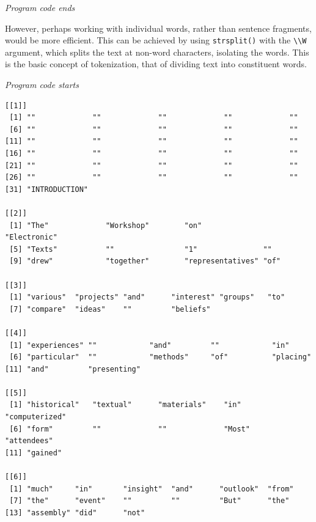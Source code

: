 \emph{Program code ends}

However, perhaps working with individual words, rather than sentence fragments,
would be more efficient. This can be achieved by using
\texttt{strsplit()} with the \texttt{\textbackslash{}\textbackslash{}W}
argument, which splits the text at non-word characters, isolating the
words. This is the basic concept of tokenization, that of dividing text into
constituent words.

\emph{Program code starts}

\begin{Shaded}
\begin{Highlighting}[]
\OtherTok{\textless{}{-}} \SpecialCharTok{\textbackslash{}\textbackslash{}}\NormalTok{)}
\end{Highlighting}
\end{Shaded}

\begin{verbatim}
[[1]]
 [1] ""             ""             ""             ""             ""            
 [6] ""             ""             ""             ""             ""            
[11] ""             ""             ""             ""             ""            
[16] ""             ""             ""             ""             ""            
[21] ""             ""             ""             ""             ""            
[26] ""             ""             ""             ""             ""            
[31] "INTRODUCTION"

[[2]]
 [1] "The"             "Workshop"        "on"              "Electronic"     
 [5] "Texts"           ""                "1"               ""               
 [9] "drew"            "together"        "representatives" "of"             

[[3]]
 [1] "various"  "projects" "and"      "interest" "groups"   "to"      
 [7] "compare"  "ideas"    ""         "beliefs" 

[[4]]
 [1] "experiences" ""            "and"         ""            "in"         
 [6] "particular"  ""            "methods"     "of"          "placing"    
[11] "and"         "presenting" 

[[5]]
 [1] "historical"   "textual"      "materials"    "in"           "computerized"
 [6] "form"         ""             ""             "Most"         "attendees"   
[11] "gained"      

[[6]]
 [1] "much"     "in"       "insight"  "and"      "outlook"  "from"    
 [7] "the"      "event"    ""         ""         "But"      "the"     
[13] "assembly" "did"      "not"     
\end{verbatim}

